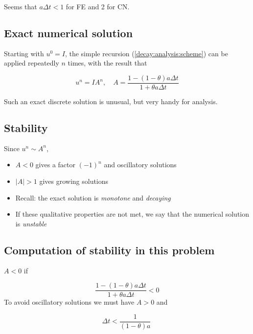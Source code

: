 \documentclass[%
oneside,                 %
final,                   %
10pt]{article}
\begin{document}
Seems that $a\Delta t < 1$ for FE and 2 for CN.

\subsection*{Exact numerical solution}

Starting with $u^0=I$, the simple recursion (\ref{decay:analysis:scheme})
can be applied repeatedly $n$ times, with the result that

\begin{equation}
u^{n} = IA^n,\quad A = \frac{1 - (1-\theta) a\Delta t}{1 + \theta a\Delta t}
\label{decay:analysis:unex}
\end{equation}

Such an exact discrete solution is unusual, but very handy for analysis.

\subsection*{Stability}


Since $u^n\sim A^n$,

\begin{itemize}
 \item $A < 0$ gives a factor $(-1)^n$ and oscillatory solutions

 \item $|A|>1$ gives growing solutions

 \item Recall: the exact solution is \emph{monotone} and \emph{decaying}

 \item If these qualitative properties are not met, we say that the
   numerical solution is \emph{unstable}
\end{itemize}

\noindent
\subsection*{Computation of stability in this problem}

$A < 0$ if

\[
\frac{1 - (1-\theta) a\Delta t}{1 + \theta a\Delta t} < 0
\]
To avoid oscillatory solutions we must have $A> 0$ and

\begin{equation}
\Delta t < \frac{1}{(1-\theta)a}\ 
\end{equation}
\end{document}
